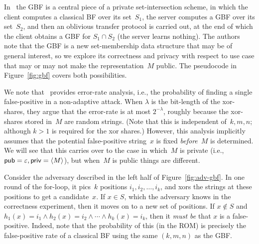 In~\cite{dong2013private} the GBF is a central piece of a private set-intersection
scheme, in which the client computes a classical BF over its
set~$S_1$, the server computes a GBF over its set~$S_2$, and then an
oblivious transfer protocol is carried out, at the end of which the
client obtains a GBF for $S_1 \cap S_2$ (the server learns nothing).
The authors note that the GBF is a new set-membership data structure
that may be of general interest, so we explore its correctness and
privacy with respect to use case that may or may not make the
representation~$M$ public. The pseudocode in Figure~\ref{fig:gbf}
covers both possibilities.

We note that~\cite{dong2013private} provides error-rate analysis, i.e., the
probability of finding a single false-positive in a non-adaptive
attack.  When $\lambda$ is the bit-length of the xor-shares, they
argue that the error-rate is at most $2^{-\lambda}$, roughly because
the xor-shares stored in~$M$ are random strings.  (Note that
  this is independent of~$k,m,n$; although $k>1$ is required for the
  xor shares.)  However, this analysis implicitly assumes that the potential false-positive string~$x$ is fixed
\emph{before}~$M$ is determined.  We will see that this carries over
 to the case in which~$M$ is private (i.e.,
${\sf pub}=\varepsilon,{\sf priv}=\langle M \rangle$), but when~$M$ is
public things are different.

Consider the adversary described in the left half of Figure~\ref{fig:adv-gbf}.  In one
round of the for-loop, it pics~$k$ positions $i_1,i_2,\ldots,i_k$, and
xors the strings at these positions to get a candidate~$x$.   If $x
\in S$, which the adversary knows in the correctness experiment, then
it moves on to a new set of positions.  If $x \not\in S$ and
$h_{1}(x)=i_1 \wedge h_2(x)=i_2 \wedge \cdots \wedge h_k(x) = i_k$,
then it \emph{must be} that $x$ is a false-positive.   Indeed, note
that the probability of this (in the ROM) is precisely the
false-positive rate of a classical BF using the same $(k,m,n)$ as the GBF.

